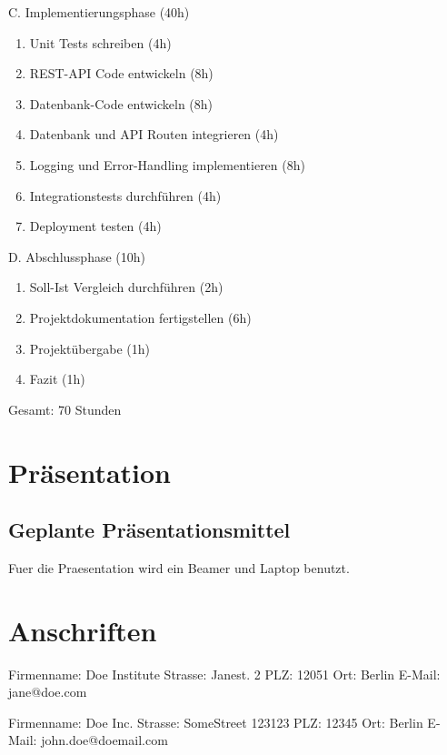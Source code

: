 \documentclass[11pt, a4paper]{article}
\begin{document}
\noindent C. Implementierungsphase (40h)
\begin{enumerate}
  \item Unit Tests schreiben (4h)
  \item REST-API Code entwickeln (8h)
  \item Datenbank-Code entwickeln (8h)
  \item Datenbank und API Routen integrieren (4h)
  \item Logging und Error-Handling implementieren (8h)
  \item Integrationstests durchführen (4h)
  \item Deployment testen (4h)
\end{enumerate}

\noindent D. Abschlussphase (10h)
\begin{enumerate}
  \item Soll-Ist Vergleich durchführen (2h)
  \item Projektdokumentation fertigstellen (6h)
  \item Projektübergabe (1h)
  \item Fazit (1h)
\end{enumerate}

Gesamt: 70 Stunden

\section{Pr{\"a}sentation}
\subsection{Geplante Pr{\"a}sentationsmittel}
Fuer die Praesentation wird ein Beamer und Laptop benutzt.

\section{Anschriften}
\newline
Firmenname: Doe Institute\newline
Strasse: Janest. 2\newline
PLZ: 12051 \newline
Ort: Berlin\newline
E-Mail: jane@doe.com\newline

\newline
Firmenname: Doe Inc.\newline
Strasse: SomeStreet 123123\newline
PLZ: 12345\newline
Ort: Berlin\newline
E-Mail: john.doe@doemail.com\newline
\newpage
\end{document}
